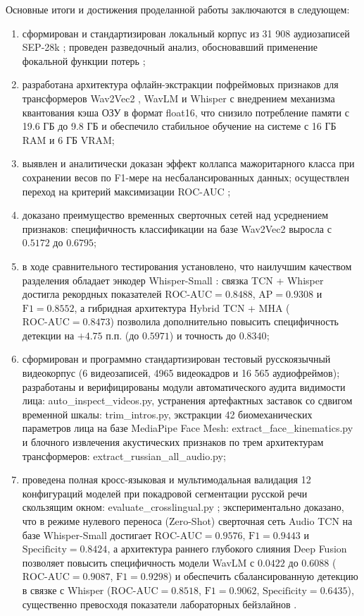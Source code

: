 \documentclass[a4paper,14pt]{extarticle}
\begin{document}
	Основные итоги и достижения проделанной работы заключаются в следующем:
	\begin{enumerate}
		\item сформирован и стандартизирован локальный корпус из 31 908 аудиозаписей SEP-28k \cite{sep28k}; проведен разведочный анализ, обосновавший применение фокальной функции потерь \cite{focalloss};
		\item разработана архитектура офлайн-экстракции пофреймовых признаков для трансформеров Wav2Vec2 \cite{wav2vec}, WavLM \cite{wavlm} и Whisper \cite{whisper} с внедрением механизма квантования кэша ОЗУ в формат float16, что снизило потребление памяти с 19.6 ГБ до 9.8 ГБ и обеспечило стабильное обучение на системе с 16 ГБ RAM и 6 ГБ VRAM;
		\item выявлен и аналитически доказан эффект коллапса мажоритарного класса при сохранении весов по F1-мере на несбалансированных данных; осуществлен переход на критерий максимизации ROC-AUC \cite{ivankin};
		\item доказано преимущество временных сверточных сетей \cite{tcn} над усреднением признаков: специфичность классификации на базе Wav2Vec2 выросла с $0.5172$ до $0.6795$;
		\item в ходе сравнительного тестирования установлено, что наилучшим качеством разделения обладает энкодер Whisper-Small \cite{whisper}: связка TCN + Whisper достигла рекордных показателей $\text{ROC-AUC} = 0.8488$, $\text{AP} = 0.9308$ и $\text{F1} = 0.8552$, а гибридная архитектура Hybrid TCN + MHA ($\text{ROC-AUC} = 0.8473$) позволила дополнительно повысить специфичность детекции на $+4.75$ п.п. (до $0.5971$) и точность до $0.8340$;
		\item сформирован и программно стандартизирован тестовый русскоязычный видеокорпус (6 видеозаписей, 4965 видеокадров и 16 565 аудиофреймов); разработаны и верифицированы модули автоматического аудита видимости лица: auto\_\allowbreak inspect\_\allowbreak videos.py, устранения артефактных заставок со сдвигом временной шкалы: trim\_\allowbreak intros.py, экстракции 42 биомеханических параметров лица на базе MediaPipe Face Mesh: extract\_\allowbreak face\_\allowbreak kinematics.py \cite{mediapipe} и блочного извлечения акустических признаков по трем архитектурам трансформеров: extract\_\allowbreak russian\_\allowbreak all\_\allowbreak audio.py;
		\item проведена полная кросс-языковая и мультимодальная валидация 12 конфигураций моделей при покадровой сегментации русской речи скользящим окном: evaluate\_\allowbreak crosslingual.py \cite{ivankin}; экспериментально доказано, что в режиме нулевого переноса (Zero-Shot) сверточная сеть Audio TCN на базе Whisper-Small достигает $\text{ROC-AUC} = 0.9576$, $\text{F1} = 0.9443$ и $\text{Specificity} = 0.8424$, а архитектура раннего глубокого слияния Deep Fusion позволяет повысить специфичность модели WavLM с $0.0422$ до $0.6088$ ($\text{ROC-AUC} = 0.9087$, $\text{F1} = 0.9298$) и обеспечить сбалансированную детекцию в связке с Whisper ($\text{ROC-AUC} = 0.8518$, $\text{F1} = 0.9062$, $\text{Specificity} = 0.6435$), существенно превосходя показатели лабораторных бейзлайнов \cite{ivankin}.
		\end{enumerate}
		
\end{document}
